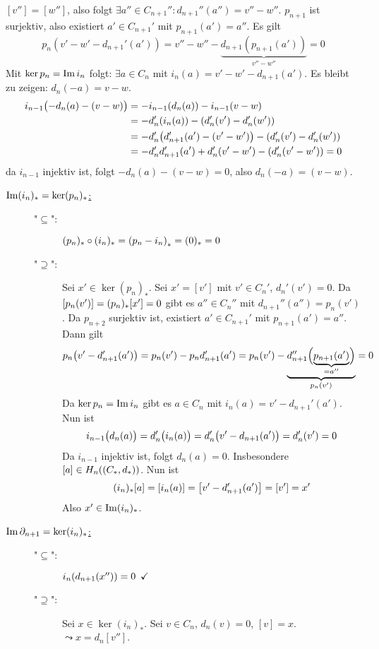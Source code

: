 $[v'']=[w'']$, also folgt $\exists a'' \in C_{n+1}'' : d_{n+1}'' (a'')=v'' - w''$. $p_{n+1}$ ist surjektiv, also existiert $a' \in C_{n+1}'$ mit
$p_{n+1}(a')=a''$. Es gilt
\[
	p_n(v'-w'- d_{n+1}'(a')) = v'' - w'' - \underbrace{d_{n+1}(p_{n+1}(a'))}_{v''- w''} = 0
\]
Mit $\ker p_n = \im i_n$ folgt: $\exists a \in C_n$ mit $i_n(a)=v'- w' - d_{n+1}(a')$. Es bleibt zu zeigen: $d_n(-a)= v-w$.
\begin{align*}
	i_{n-1} \enbrace[\big]{-d_n(a)- (v-w)} & = -i_{n-1} \enbrace*{d_n(a)} - i_{n-1}(v-w) \\ &= - d_n' \enbrace*{i_n(a)} - \enbrace*{d_n'(v')- d_n'(w')}  \\  
	&= -d_n' \enbrace*{ d_{n+1}' (a') - (v'-w')} - \enbrace*{ d_n'(v') - d_n'(w')}  \\
	&= - d_n' d_{n+1}' (a') + d_n'(v'- w') -  \enbrace*{d_n'(v'-w')} = 0
\end{align*}
da $i_{n-1}$ injektiv ist, folgt $-d_n(a)- (v-w) = 0$, also $d_n(-a)=(v-w)$.
\begin{description}
	\item[\uline{$\im (i_n)_* = \ker (p_n)_*$:}] 
	\begin{description}
		\item["$\subseteq$":] $(p_n)_* \circ (i_n)_* = \enbrace*{p_n-i_n}_* = (0)_* =0 $
		\item["$\supseteq$":] Sei $x' \in \ker (p_n)_*$. Sei $x'= [v']$ mit $v' \in C_n'$, $d_n'(v')=0$. Da $\benbrace*{p_n(v')}= (p_n)_* [x'] = 0$ gibt es $a'' \in C_n''$
		mit $d_{n+1}''(a'') = p_n(v')$. Da $p_{n+2}$ surjektiv ist, existiert $a' \in C_{n+1}'$ mit $p_{n+1}(a')=a''$. Dann gilt
		\begin{align*}
			p_n \enbrace*{v' - d_{n+1}'(a')} = p_n(v') - p_n d_{n+1}'(a') = p_n(v') -  \underbrace{ d_{n+1}''\enbrace[\Big]{\underbrace{p_{n+1}(a')}_{=a''}}}_{p_n(v')} = 0  
		\end{align*}
		Da $\ker p_n = \im i_n$ gibt es $a \in C_n$ mit $i_n(a)= v'- d_{n+1}'(a')$. Nun ist 
		\[
			i_{n-1} \enbrace[\big]{d_n(a)} = d_n' \enbrace[\big]{i_n(a)} = d_n' \enbrace[\big]{v'- d_{n+1}(a')}  = d_n'(v') = 0 
		\]
		Da $i_{n-1}$ injektiv ist, folgt $d_n(a)=0$. Insbesondere $[a] \in H_n \enbrace*{(C_*,d_*)}$. Nun ist 
		\[
			(i_n)_* [a] = [i_n(a)] = \benbrace*{v'- d_{n+1}'(a')} = [v'] = x' 
		\]
		Also $x' \in \im (i_n)_*$.
	\end{description}
	\item[\uline{$\im \partial_{n+1} = \ker (i_n)_*$:}] \begin{description}
		\item["$\subseteq$":] $i_n \enbrace*{d_{n+1}(x'')}= 0 \enspace\checkmark$
		\item["$\supseteq$":] Sei $x \in \ker (i_n)_*$. Sei $v \in C_n$, $d_n(v)=0$, $[v]=x$. $\leadsto x= d_n [v'']$.
	\end{description} 
\end{description}

